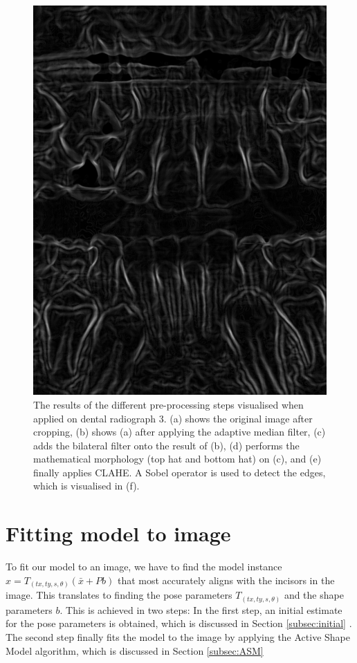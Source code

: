 \documentclass[a4paper,titlepage,12pt]{article}
\begin{document}
\begin{figure}
\begin{minipage}[b]{0.32\linewidth}
		\includegraphics[width=\linewidth]{preprocess/gradients.png}
	\end{minipage}
  \caption{
		The results of the different pre-processing steps visualised when applied on dental radiograph 3.
		(a) shows the original image after cropping, (b) shows (a) after applying the adaptive median filter, (c) adds the bilateral filter onto the result of (b), (d) performs the mathematical morphology (top hat and bottom hat) on (c), and (e) finally applies CLAHE. A Sobel operator is used to detect the edges, which is visualised in (f).} \label{preprocess}
\end{figure}


\section{Fitting model to image}
To fit our model to an image, we have to find the model instance $x =T_{(tx,ty,s,\theta)}(\bar{x} + Pb)$ that most accurately aligns with the incisors in the image.
This translates to finding the pose parameters $T_{(tx,ty,s,\theta)}$ and the shape parameters $b$.
This is achieved in two steps: In the first step, an initial estimate for the pose parameters is obtained, which is discussed in Section \ref{subsec:initial} . The second step finally fits the model to the image by applying the Active Shape Model algorithm, which is discussed in Section \ref{subsec:ASM}
\end{document}
